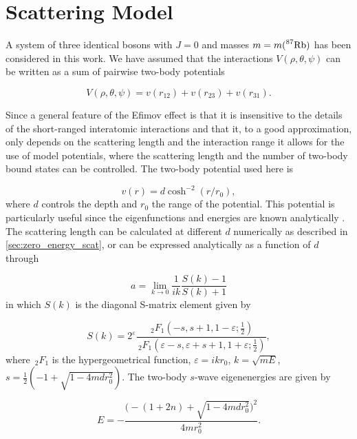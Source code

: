 \chapter{Scattering Model}
A system of three identical bosons with $J=0$ and masses $m = m( \prescript{87}{}{\mathrm{Rb}})$ has been considered in this work. We have assumed that the interactions $V(\rho,\theta,\psi)$ can be written as a sum of pairwise two-body potentials   

\begin{equation}\label{eq:potential_sum}
V(\rho,\theta,\psi) = v(r_{12}) + v(r_{23}) + v(r_{31}).
\end{equation} 

Since a general feature of the Efimov effect is that it is insensitive to the details of the short-ranged interatomic interactions and that it, to a good approximation, only depends on the scattering length and the interaction range it allows for the use of model potentials, where the scattering length and the number of two-body bound states can be controlled. The two-body potential used here is  

\begin{equation}\label{eq:two_b_potential}
v(r) = d\cosh^{-2}{(r/r_0)},
\end{equation}
where $d$ controls the depth and $r_0$ the range of the potential.
This potential is particularly useful since the eigenfunctions and energies are known analytically \cite{Landau1965Quantum}. The scattering length can be calculated at different $d$ numerically as described in \cref{sec:zero_energy_scat}, or can be expressed analytically as a function of $d$ through 

\begin{equation}
a = \lim_{k \to 0} \frac{1}{ik} \frac{S(k)-1}{S(k)+1}
\end{equation}
in which $S(k)$ is the diagonal S-matrix element given by

\begin{equation}
S(k) = 2^{\varepsilon} \frac{\,_2F_1(-s, s+1, 1-\varepsilon;\frac{1}{2})}{\,_2F_1(\varepsilon-s, \varepsilon + s+1, 1+\varepsilon;\frac{1}{2})},
\end{equation}
where $\,_2F_1$ is the hypergeometrical function, $\varepsilon = ikr_0$, $k = \sqrt{mE}$, $s = \frac{1}{2}(-1 + \sqrt{1-4 m d r_0^2})$. The two-body $s$-wave eigenenergies are given by

\begin{equation}
E = -\frac{\Big(-(1+2n)+\sqrt{1-4mdr_0^2}\Big)^2}{4mr_0^2}.
\end{equation}

